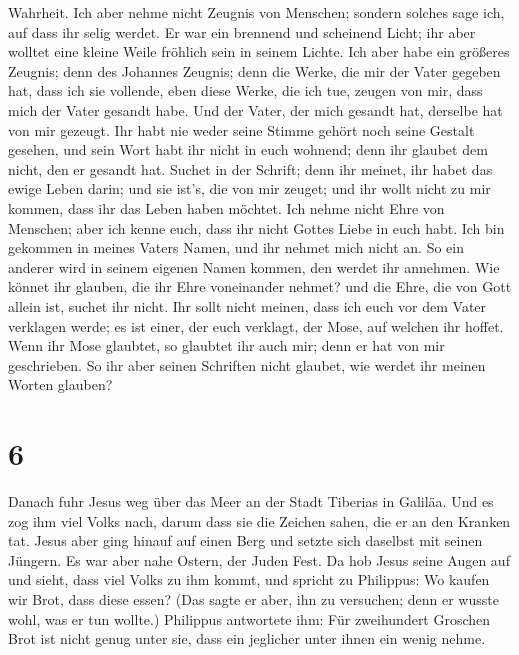 Wahrheit.  Ich aber nehme nicht Zeugnis von Menschen;
sondern solches sage ich, auf dass ihr selig werdet.  Er
war ein brennend und scheinend Licht; ihr aber wolltet eine kleine Weile
fröhlich sein in seinem Lichte.  Ich aber habe ein
größeres Zeugnis; denn des Johannes Zeugnis; denn die Werke, die mir der
Vater gegeben hat, dass ich sie vollende, eben diese Werke, die ich tue,
zeugen von mir, dass mich der Vater gesandt habe.  Und
der Vater, der mich gesandt hat, derselbe hat von mir gezeugt. Ihr habt
nie weder seine Stimme gehört noch seine Gestalt gesehen,
 und sein Wort habt ihr nicht in euch wohnend; denn ihr
glaubet dem nicht, den er gesandt hat.  Suchet in der
Schrift; denn ihr meinet, ihr habet das ewige Leben darin; und sie
ist's, die von mir zeuget;  und ihr wollt nicht zu mir
kommen, dass ihr das Leben haben möchtet.  Ich nehme
nicht Ehre von Menschen;  aber ich kenne euch, dass ihr
nicht Gottes Liebe in euch habt.  Ich bin gekommen in
meines Vaters Namen, und ihr nehmet mich nicht an. So ein anderer wird
in seinem eigenen Namen kommen, den werdet ihr annehmen. 
Wie könnet ihr glauben, die ihr Ehre voneinander nehmet? und die Ehre,
die von Gott allein ist, suchet ihr nicht.  Ihr sollt
nicht meinen, dass ich euch vor dem Vater verklagen werde; es ist einer,
der euch verklagt, der Mose, auf welchen ihr hoffet. 
Wenn ihr Mose glaubtet, so glaubtet ihr auch mir; denn er hat von mir
geschrieben.  So ihr aber seinen Schriften nicht glaubet,
wie werdet ihr meinen Worten glauben?

\hypertarget{section-5}{%
\section{6}\label{section-5}}

 Danach fuhr Jesus weg über das Meer an der Stadt Tiberias
in Galiläa.  Und es zog ihm viel Volks nach, darum dass
sie die Zeichen sahen, die er an den Kranken tat.  Jesus
aber ging hinauf auf einen Berg und setzte sich daselbst mit seinen
Jüngern.  Es war aber nahe Ostern, der Juden Fest.
 Da hob Jesus seine Augen auf und sieht, dass viel Volks
zu ihm kommt, und spricht zu Philippus: Wo kaufen wir Brot, dass diese
essen?  (Das sagte er aber, ihn zu versuchen; denn er
wusste wohl, was er tun wollte.)  Philippus antwortete
ihm: Für zweihundert Groschen Brot ist nicht genug unter sie, dass ein
jeglicher unter ihnen ein wenig nehme.

